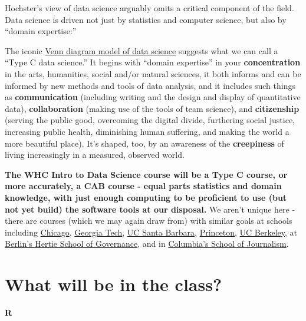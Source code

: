 \documentclass[]{book}
\theoremstyle{definition}
\theoremstyle{definition}
\theoremstyle{definition}
\theoremstyle{remark}
\begin{document}
Hochster's view of data science arguably omits a critical component of
the field. Data science is driven not just by statistics and computer
science, but also by ``domain expertise:''

The iconic
\href{https://www.google.com/search?q=venn+diagram+model+of+data+science\&newwindow=1\&safe=active\&rlz=1C1CHBF_enUS762US763\&tbm=isch\&tbo=u\&source=univ\&sa=X\&ved=0ahUKEwiM_abBtY7XAhXDQCYKHdgyB58QsAQIOg\&biw=1378}{Venn
diagram model of data science} suggests what we can call a ``Type C data
science.'' It begins with ``domain expertise'' in your
\textbf{concentration} in the arts, humanities, social and/or natural
sciences, it both informs and can be informed by new methods and tools
of data analysis, and it includes such things as \textbf{communication}
(including writing and the design and display of quantitative data),
\textbf{collaboration} (making use of the tools of team science), and
\textbf{citizenship} (serving the public good, overcoming the digital
divide, furthering social justice, increasing public health, diminishing
human suffering, and making the world a more beautiful place). It's
shaped, too, by an awareness of the \textbf{creepiness} of living
increasingly in a measured, observed world.

\textbf{The WHC Intro to Data Science course will be a Type C course, or
more accurately, a CAB course - equal parts statistics and domain
knowledge, with just enough computing to be proficient to use (but not
yet build) the software tools at our disposal.} We aren't unique here -
there are courses (which we may again draw from) with similar goals at
schools including
\href{https://github.com/UC-MACSS/persp-analysis}{Chicago},
\href{https://github.com/jacobeisenstein/gt-css-class}{Georgia Tech},
\href{https://github.com/raviolli77/dataScience-UCSBProjectGroup-Syllabus}{UC
Santa Barbara},
\href{http://www.princeton.edu/~mjs3/soc596_f2016/}{Princeton},
\href{https://github.com/rochelleterman/PS239T}{UC Berkeley}, at
\href{https://github.com/HertieDataScience/SyllabusAndLectures}{Berlin's
Hertie School of Governance}, and in
\href{https://github.com/tommeagher/data1-fall2015}{Columbia's School of
Journalism}.

\hypertarget{what-will-be-in-the-class}{%
\section{What will be in the class?}\label{what-will-be-in-the-class}}

\textbf{R}
\end{document}
